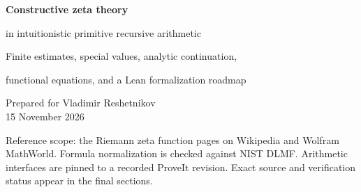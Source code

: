 \documentclass[11pt,letterpaper]{article}
\theoremstyle{definition}
\begin{document}
\hypersetup{pageanchor=false}
\begin{titlepage}
\vspace*{1.2cm}
{\color{ink}\LARGE\bfseries Constructive zeta theory\par}
\vspace{0.45cm}
{\Large in intuitionistic primitive recursive arithmetic\par}
\vspace{0.8cm}
{\large Finite estimates, special values, analytic continuation,\par
functional equations, and a Lean formalization roadmap\par}
\vspace{1.0cm}
Prepared for Vladimir Reshetnikov\\[3pt]
15 November 2026
\vspace{1.1cm}
\begin{abstract}
We develop a substantial portion of the classical theory of the Riemann
zeta function by explicit finite arguments suitable for first-order
intuitionistic primitive recursive arithmetic. The constructions include
Dirichlet and Euler-product representations with moduli, a uniform
finite-block proof of divergence of the defining series on
$\Re s\le1$, an entire regular part obtained by finite Euler--Maclaurin
summation, all nonpositive and positive even integer values, Stieltjes
coefficients, the theta transformation and both standard functional
equations, the entire xi function, arithmetic Dirichlet series, a global Euler--Hasse series, integral
representations, simple trivial zeros, and a quantitative zero-free
boundary theorem. Every analytic limit is read through prescribed
rational approximations and primitive recursive error bounds.

The arithmetic assertions are uniform for coded rational inputs and are
schemas in each fixed certified primitive recursive real or complex
name. They do not postulate an arbitrary-real sort, choice, an unrestricted
identity theorem, or a universal primitive recursive program evaluator.
The package includes exact rational enclosure software and a detailed
Lean outline. The mathematical proofs are human-readable; the analytic
development has not been kernel checked and no completed iPRA proof
certificate is claimed.
\end{abstract}
\vfill
\small
Reference scope: the Riemann zeta function pages on Wikipedia and Wolfram
MathWorld. Formula normalization is checked against NIST DLMF. Arithmetic
interfaces are pinned to a recorded ProveIt revision. Exact source and
verification status appear in the final sections.
\end{titlepage}
\hypersetup{pageanchor=true}
\tableofcontents
\clearpage
\end{document}
